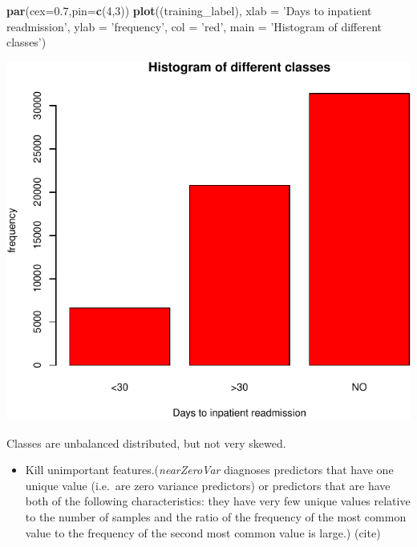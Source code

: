 \documentclass[]{article}
\newenvironment{Shaded}{\begin{snugshade}}{\end{snugshade}}
\newcommand{\KeywordTok}[1]{\textcolor[rgb]{0.13,0.29,0.53}{\textbf{{#1}}}}
\newcommand{\DataTypeTok}[1]{\textcolor[rgb]{0.13,0.29,0.53}{{#1}}}
\newcommand{\DecValTok}[1]{\textcolor[rgb]{0.00,0.00,0.81}{{#1}}}
\newcommand{\FloatTok}[1]{\textcolor[rgb]{0.00,0.00,0.81}{{#1}}}
\newcommand{\StringTok}[1]{\textcolor[rgb]{0.31,0.60,0.02}{{#1}}}
\newcommand{\NormalTok}[1]{{#1}}
\begin{document}
\begin{Shaded}
\begin{Highlighting}[]
\KeywordTok{par}\NormalTok{(}\DataTypeTok{cex=}\FloatTok{0.7}\NormalTok{,}\DataTypeTok{pin=}\KeywordTok{c}\NormalTok{(}\DecValTok{4}\NormalTok{,}\DecValTok{3}\NormalTok{))}
\KeywordTok{plot}\NormalTok{((training_label), }\DataTypeTok{xlab =} \StringTok{'Days to inpatient readmission'}\NormalTok{, }\DataTypeTok{ylab =} \StringTok{'frequency'}\NormalTok{,}
     \DataTypeTok{col =} \StringTok{'red'}\NormalTok{, }\DataTypeTok{main =} \StringTok{'Histogram of different classes'}\NormalTok{)}
\end{Highlighting}
\end{Shaded}

\includegraphics{Project_files/figure-latex/Preprocessing_classtype-1.pdf}

Classes are unbalanced distributed, but not very skewed.

\begin{itemize}
\itemsep1pt\parskip0pt
\item
  Kill unimportant features.(\emph{nearZeroVar} diagnoses predictors
  that have one unique value (i.e.~are zero variance predictors) or
  predictors that are have both of the following characteristics: they
  have very few unique values relative to the number of samples and the
  ratio of the frequency of the most common value to the frequency of
  the second most common value is large.) (cite)
\end{itemize}
\end{document}
